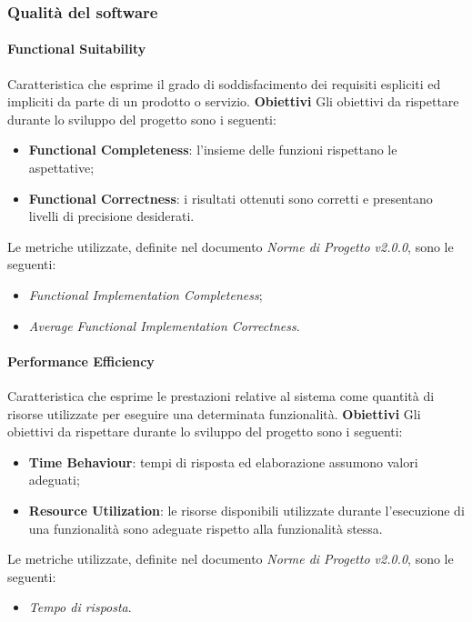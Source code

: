 \subsubsection{Qualità del software}
\paragraph{Functional Suitability} \Spazio
	Caratteristica che esprime il grado di soddisfacimento dei requisiti espliciti ed impliciti da parte di un prodotto o servizio. \Spazio
	\textbf{Obiettivi} \Spazio
	Gli obiettivi da rispettare durante lo sviluppo del progetto sono i seguenti:
	\begin{itemize}
			\item{\textbf{Functional Completeness}: l'insieme delle funzioni rispettano le aspettative;
			}
			\item{\textbf{Functional Correctness}: i risultati ottenuti sono corretti e presentano livelli di precisione desiderati.
			}
	\end{itemize}
	Le metriche utilizzate, definite nel documento \emph{Norme di Progetto v2.0.0}, sono le seguenti:
	\begin{itemize}
		\item{\emph{Functional Implementation Completeness};}
		\item{\emph{Average Functional Implementation Correctness}.}			
	\end{itemize}	

\paragraph{Performance Efficiency} \Spazio
	Caratteristica che esprime le prestazioni relative al sistema come quantità di risorse utilizzate per eseguire una determinata funzionalità. \Spazio
	\textbf{Obiettivi} \Spazio
	Gli obiettivi da rispettare durante lo sviluppo del progetto sono i seguenti:
	\begin{itemize}
			\item{\textbf{Time Behaviour}: tempi di risposta ed elaborazione assumono valori adeguati;
			}
			\item{\textbf{Resource Utilization}: le risorse disponibili utilizzate durante l'esecuzione di una funzionalità sono adeguate rispetto alla funzionalità stessa.
			}
	\end{itemize}
	Le metriche utilizzate, definite nel documento \emph{Norme di Progetto v2.0.0}, sono le seguenti:
	\begin{itemize}
		\item{\emph{Tempo di risposta}.}
	\end{itemize}

